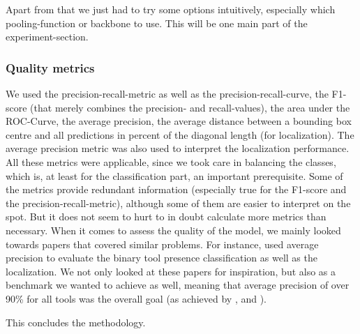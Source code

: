 Apart from that we just had to try some options intuitively, especially which pooling-function or backbone to use. This will be one main part of the experiment-section.

\subsubsection{Quality metrics}

We used the precision-recall-metric as well as the precision-recall-curve, the F1-score (that merely combines the precision- and recall-values), the area under the ROC-Curve, the average precision, the average distance between a bounding box centre and all predictions in percent of the diagonal length (for localization). The average precision metric was also used to interpret the localization performance. All these metrics were applicable, since we took care in balancing the classes, which is, at least for the classification part, an important prerequisite. Some of the metrics provide redundant information (especially true for the F1-score and the precision-recall-metric), although some of them are easier to interpret on the spot. But it does not seem to hurt to in doubt calculate more metrics than necessary.
When it comes to assess the quality of the model, we mainly looked towards papers that covered similar problems. For instance, \cite{Vardazaryan} used average precision to evaluate the binary tool presence classification as well as the localization. We not only looked at these papers for inspiration, but also as a benchmark we wanted to achieve as well, meaning that average precision of over 90\% for all tools was the overall goal (as achieved by \cite{Vardazaryan}, \cite{endonet} and \cite{lstm}).

This concludes the methodology.
